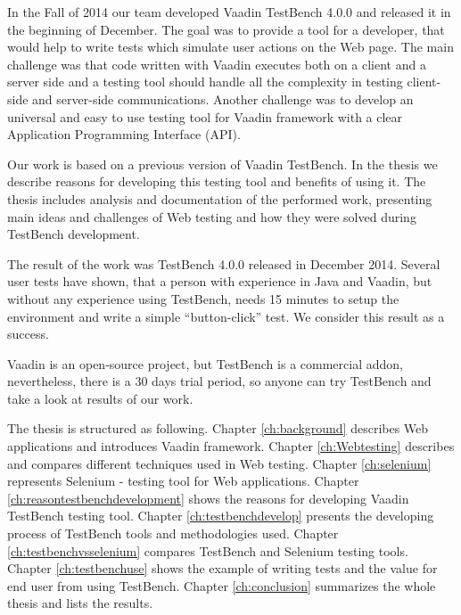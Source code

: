 	 In the Fall of 2014 our team developed Vaadin TestBench
	 4.0.0 and released it in the beginning of December. The goal was to provide a
	 tool for a developer, that would help to write tests which simulate user
	 actions on the Web page. The main challenge was that code written with Vaadin
	 executes both on a client and a server side and a testing tool should handle
	 all the complexity in testing client-side and server-side communications. Another challenge was
	 to develop an universal and easy to use testing tool for Vaadin framework with a
	 clear Application Programming Interface (API).
	 
	 Our work is based on a previous version of Vaadin TestBench. In the thesis
	 we describe reasons for developing this testing tool and benefits of using it.
	 The thesis includes analysis and documentation of the performed work,
	 presenting main ideas and challenges of Web testing and how they were
	 solved during TestBench development.
	 
	 The result of the work was TestBench 4.0.0 released in December 2014.
	 Several user tests have shown, that a person with experience in Java and
	 Vaadin, but without any experience using TestBench, needs 15 minutes to setup
	 the environment and write a simple ``button-click'' test. We consider this
	 result as a success.
	  
	 Vaadin is an open-source project, but TestBench is a commercial
	 addon, nevertheless, there is a 30 days trial period, so anyone
	 can try TestBench and take a look at results of our work.
	  

	  The thesis is structured as following. Chapter \ref{ch:background} describes
	  Web applications and introduces Vaadin framework. Chapter \ref{ch:Webtesting}
	  describes and compares different techniques used in Web testing. Chapter
	  \ref{ch:selenium} represents Selenium - testing tool for Web applications.
	  Chapter \ref{ch:reasontestbenchdevelopment} shows the reasons for
	  developing Vaadin TestBench testing tool. Chapter \ref{ch:testbenchdevelop} presents the developing process of TestBench tools and methodologies used.
	  Chapter \ref{ch:testbenchvsselenium} compares TestBench and Selenium testing
	  tools. Chapter \ref{ch:testbenchuse} shows the example of writing tests and
	  the value for end user from using TestBench. 
	  Chapter \ref{ch:conclusion} summarizes the whole thesis and lists the
	  results.

